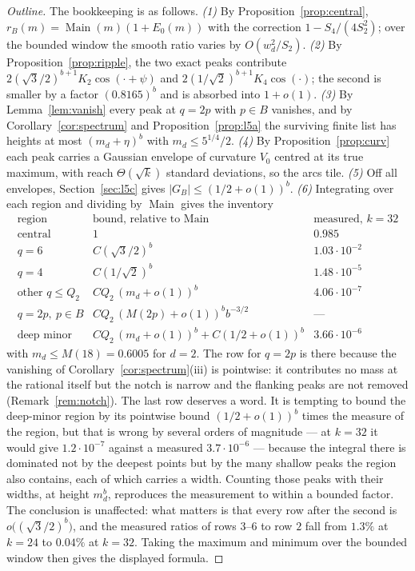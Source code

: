 \documentclass[11pt,a4paper]{article}
\theoremstyle{plain}
\theoremstyle{definition}
\theoremstyle{remark}
\DeclareMathOperator{\Main}{Main}
\begin{document}
\begin{proof}[Outline]
The bookkeeping is as follows.
\emph{(1)} By Proposition~\ref{prop:central}, $r_B(m)=\Main(m)(1+E_0(m))$ with
the correction $1-S_4/(4S_2^{2})$; over the bounded window the smooth ratio
varies by $O(w_d^{2}/S_2)$.
\emph{(2)} By Proposition~\ref{prop:ripple}, the two exact peaks contribute
$2(\sqrt3/2)^{b+1}K_2\cos(\cdot+\psi)$ and $2(1/\sqrt2)^{b+1}K_4\cos(\cdot)$;
the second is smaller by a factor $(0.8165)^{b}$ and is absorbed into $1+o(1)$.
\emph{(3)} By Lemma~\ref{lem:vanish} every peak at $q=2p$ with $p\in B$
vanishes, and by Corollary~\ref{cor:spectrum} and Proposition~\ref{prop:l5a} the
surviving finite list has heights at most $(m_d+\eta)^{b}$ with
$m_d\le5^{1/4}/2$.
\emph{(4)} By Proposition~\ref{prop:curv} each peak carries a Gaussian envelope
of curvature $V_0$ centred at its true maximum, with reach $\Theta(\sqrt k)$
standard deviations, so the arcs tile.
\emph{(5)} Off all envelopes, Section~\ref{sec:l5c} gives
$|G_B|\le(1/2+o(1))^{b}$.
\emph{(6)} Integrating over each region and dividing by $\Main$ gives the
inventory
\[
  \begin{array}{l|l|l}
    \text{region} & \text{bound, relative to }\Main & \text{measured, }k=32\\\hline
    \text{central} & 1 & 0.985\\
    q=6 & C(\sqrt3/2)^{b} & 1.03\cdot10^{-2}\\
    q=4 & C(1/\sqrt2)^{b} & 1.48\cdot10^{-5}\\
    \text{other }q\le Q_2 & CQ_2\,(m_d+o(1))^{b} & 4.06\cdot10^{-7}\\
    q=2p,\ p\in B & CQ_2\,(M(2p)+o(1))^{b}b^{-3/2} & \text{---}\\
    \text{deep minor} & CQ_2\,(m_d+o(1))^{b}+C(1/2+o(1))^{b} & 3.66\cdot10^{-6}
  \end{array}
\]
with $m_d\le M(18)=0.6005$ for $d=2$. The row for $q=2p$ is there because the
vanishing of Corollary~\ref{cor:spectrum}(iii) is pointwise: it contributes no
mass at the rational itself but the notch is narrow and the flanking peaks
are not removed (Remark~\ref{rem:notch}). The last row deserves a word. It is
tempting to bound the deep-minor region by its pointwise bound
$(1/2+o(1))^{b}$ times the measure of the region, but that is wrong by several
orders of magnitude --- at $k=32$ it would give $1.2\cdot10^{-7}$ against a
measured $3.7\cdot10^{-6}$ --- because the integral there is dominated not by
the deepest points but by the many shallow peaks the region also contains, each
of which carries a width. Counting those peaks with their widths, at height
$m_d^{b}$, reproduces the measurement to within a bounded factor. The
conclusion is unaffected: what matters is that every row after the second is
$o\bigl((\sqrt3/2)^{b}\bigr)$, and the measured ratios of rows $3$--$6$ to row
$2$ fall from $1.3\%$ at $k=24$ to $0.04\%$ at $k=32$. Taking the maximum and
minimum over the bounded window then gives the displayed formula.
\end{proof}
\end{document}
